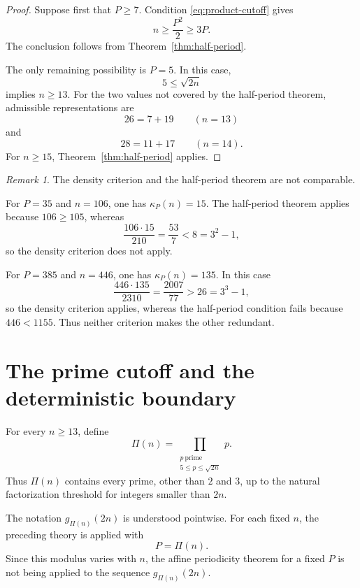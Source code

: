 \documentclass[12pt]{article}
\numberwithin{equation}{section}
\theoremstyle{definition}
\theoremstyle{remark}
\newtheorem{remark}[theorem]{Remark}
\begin{document}
\begin{proof}
Suppose first that $P\geq7$. Condition
\eqref{eq:product-cutoff} gives
\[
n\geq\frac{P^2}{2}\geq3P.
\]
The conclusion follows from Theorem~\ref{thm:half-period}.

The only remaining possibility is $P=5$. In this case,
\[
5\leq\sqrt{2n}
\]
implies $n\geq13$. For the two values not covered by the
half-period theorem, admissible representations are
\[
26=7+19
\qquad
(n=13)
\]
and
\[
28=11+17
\qquad
(n=14).
\]
For $n\geq15$, Theorem~\ref{thm:half-period} applies.
\end{proof}

\begin{remark}
The density criterion and the half-period theorem are not
comparable.

For $P=35$ and $n=106$, one has $\kappa_P(n)=15$. The
half-period theorem applies because $106\geq105$, whereas
\[
\frac{106\cdot15}{210}=\frac{53}{7}<8=3^2-1,
\]
so the density criterion does not apply.

For $P=385$ and $n=446$, one has $\kappa_P(n)=135$. In this
case
\[
\frac{446\cdot135}{2310}=\frac{2007}{77}>26=3^3-1,
\]
so the density criterion applies, whereas the half-period
condition fails because $446<1155$. Thus neither criterion
makes the other redundant.
\end{remark}

\section{The prime cutoff and the deterministic boundary}

For every $n\geq13$, define
\begin{equation}
\label{eq:Pi-definition}
\Pi(n)
=
\prod_{\substack{p\ \mathrm{prime}\\
5\leq p\leq\sqrt{2n}}}p.
\end{equation}
Thus $\Pi(n)$ contains every prime, other than $2$ and $3$, up
to the natural factorization threshold for integers smaller than
$2n$.

The notation $g_{\Pi(n)}(2n)$ is understood pointwise. For each
fixed $n$, the preceding theory is applied with
\[
P=\Pi(n).
\]
Since this modulus varies with $n$, the affine periodicity
theorem for a fixed $P$ is not being applied to the sequence
$g_{\Pi(n)}(2n)$.
\end{document}
